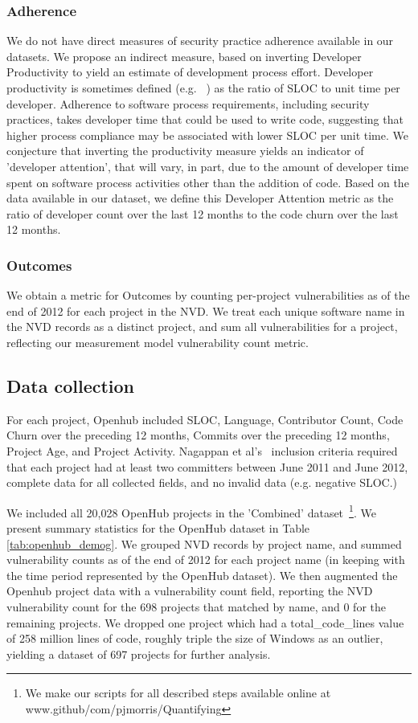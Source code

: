 \subsubsection{Adherence}
We do not have direct measures of security practice adherence available in our datasets. We propose an indirect measure, based on inverting Developer Productivity to yield an estimate of development process effort. Developer productivity is sometimes defined (e.g. ~\cite{vasilescu2016the,xuan2014focus,kan2002metrics}) as the ratio of SLOC to unit time per developer. Adherence to software process requirements, including security practices, takes developer time that could be used to write code, suggesting that higher process compliance may be associated with lower SLOC per unit time. We conjecture that inverting the productivity measure yields an indicator of 'developer attention', that will vary, in part, due to the amount of developer time spent on software process activities other than the addition of code. Based on the data available in our dataset, we define this Developer Attention metric as the ratio of developer count over the last 12 months to the code churn over the last 12 months. 

\subsubsection{Outcomes}
We obtain a metric for Outcomes by counting per-project vulnerabilities as of the end of 2012 for each project in the NVD. We treat each unique software name in the NVD records as a distinct project, and sum all vulnerabilities for a project, reflecting our measurement model vulnerability count metric. 

\subsection{Data collection}
For each project, Openhub included SLOC, Language, Contributor Count, Code Churn over the preceding 12 months, Commits over the preceding 12 months, Project Age, and Project Activity. Nagappan et al's~\cite{nagappan2013diversity} inclusion criteria required that each project had at least two committers between June 2011 and June 2012, complete data for all collected fields, and no invalid data (e.g. negative SLOC.)

We included all 20,028 OpenHub projects in the 'Combined' dataset~\footnote{We make our scripts for all described steps available online at www.github/com/pjmorris/Quantifying}. We present summary statistics for the OpenHub dataset in Table \ref{tab:openhub_demog}. We grouped NVD records by project name, and summed vulnerability counts as of the end of 2012 for each project name (in keeping with the time period represented by the OpenHub dataset). We then augmented the Openhub project data with a vulnerability count field, reporting the NVD vulnerability count for the 698 projects that matched by name, and 0 for the remaining projects. We dropped one project which had a total\_code\_lines value of 258 million lines of code, roughly triple the size of Windows as an outlier, yielding a dataset of 697 projects for further analysis.

